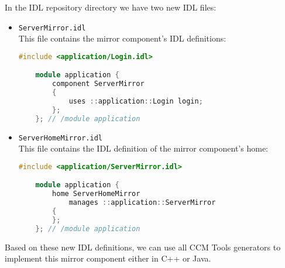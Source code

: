 In the IDL repository directory we have two new IDL files:
\begin{itemize}
  \item {\tt ServerMirror.idl} \\
  This file contains the mirror component's IDL definitions:
    \begin{lstlisting}[language=C++]
    #include <application/Login.idl>

    module application {
        component ServerMirror
        {
            uses ::application::Login login;
        };
    }; // /module application
	\end{lstlisting} 
  \item {\tt ServerHomeMirror.idl} \\
  This file contains the IDL definition of the mirror component's home:
    \begin{lstlisting}[language=C++]
    #include <application/ServerMirror.idl>

    module application {
        home ServerHomeMirror
            manages ::application::ServerMirror
        {
        };
    }; // /module application
	\end{lstlisting} 
\end{itemize}

Based on these new IDL definitions, we can use all CCM Tools generators to implement 
this mirror component either in C++ or Java.

\newpage

